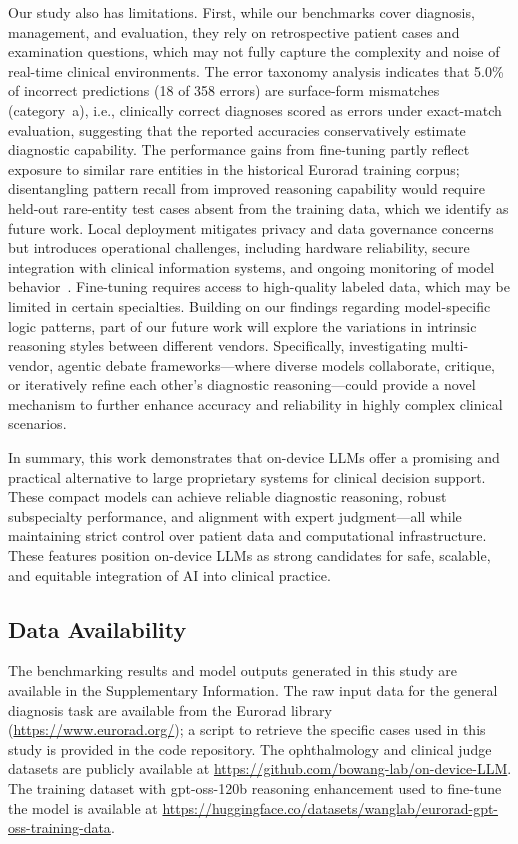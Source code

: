 \documentclass[10pt,journal,compsoc, onecolumn]{IEEEtran}
\begin{document}
Our study also has limitations. First, while our benchmarks cover diagnosis, management, and evaluation, they rely on retrospective patient cases and examination questions, which may not fully capture the complexity and noise of real-time clinical environments. The error taxonomy analysis indicates that 5.0\% of incorrect predictions (18 of 358 errors) are surface-form mismatches (category~a), i.e., clinically correct diagnoses scored as errors under exact-match evaluation, suggesting that the reported accuracies conservatively estimate diagnostic capability. The performance gains from fine-tuning partly reflect exposure to similar rare entities in the historical Eurorad training corpus; disentangling pattern recall from improved reasoning capability would require held-out rare-entity test cases absent from the training data, which we identify as future work. Local deployment mitigates privacy and data governance concerns but introduces operational challenges, including hardware reliability, secure integration with clinical information systems, and ongoing monitoring of model behavior~\cite{asgari2025hallucination, omar2025adversarial}. Fine-tuning requires access to high-quality labeled data, which may be limited in certain specialties. Building on our findings regarding model-specific logic patterns, part of our future work will explore the variations in intrinsic reasoning styles between different vendors. Specifically, investigating multi-vendor, agentic debate frameworks—where diverse models collaborate, critique, or iteratively refine each other's diagnostic reasoning—could provide a novel mechanism to further enhance accuracy and reliability in highly complex clinical scenarios.

In summary, this work demonstrates that on-device LLMs offer a promising and practical alternative to large proprietary systems for clinical decision support. These compact models can achieve reliable diagnostic reasoning, robust subspecialty performance, and alignment with expert judgment---all while maintaining strict control over patient data and computational infrastructure. These features position on-device LLMs as strong candidates for safe, scalable, and equitable integration of AI into clinical practice.


\subsection*{Data Availability}
The benchmarking results and model outputs generated in this study are available in the Supplementary Information. The raw input data for the general diagnosis task are available from the Eurorad library (\url{https://www.eurorad.org/}); a script to retrieve the specific cases used in this study is provided in the code repository. The ophthalmology and clinical judge datasets are publicly available at \url{https://github.com/bowang-lab/on-device-LLM}. The training dataset with gpt-oss-120b reasoning enhancement used to fine-tune the model is available at \url{https://huggingface.co/datasets/wanglab/eurorad-gpt-oss-training-data}.
\end{document}
